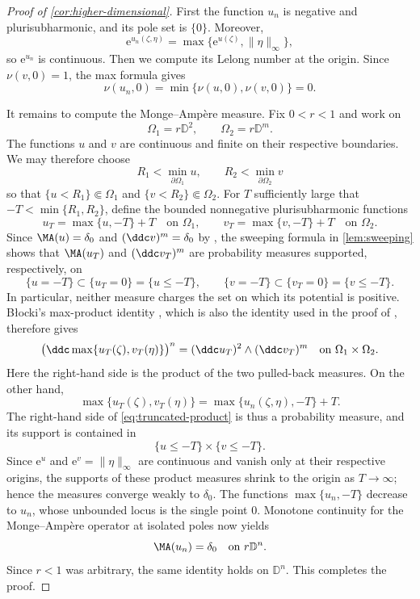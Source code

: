\documentclass[11pt,a4paper]{article}
\newcommand{\e}{\mathrm e}
\begin{document}
\begin{proof}[Proof of \cref{cor:higher-dimensional}]

First the function $u_n$ is negative and plurisubharmonic, and its pole set is $\{0\}$. Moreover,
\[
  \e^{u_n(\zeta,\eta)}=\max\{\e^{u(\zeta)},\|\eta\|_\infty\},
\]
so $\e^{u_n}$ is continuous.
Then we compute its Lelong number at the origin. Since $\nu(v,0)=1$, the max formula gives
\[
  \nu(u_n,0)=\min\{\nu(u,0),\nu(v,0)\}=0.
\]

It remains to compute the Monge--Amp\`ere measure. Fix $0<r<1$ and work on
\[
  \Omega_1=r\mathbb D^2,\qquad \Omega_2=r\mathbb D^m.
\]
The functions $u$ and $v$ are continuous and finite on their respective boundaries. We may therefore choose
\[
  R_1<\min_{\partial\Omega_1}u,\qquad R_2<\min_{\partial\Omega_2}v
\]
so that $\{u<R_1\}\Subset\Omega_1$ and $\{v<R_2\}\Subset\Omega_2$. For $T$ sufficiently large that $-T<\min\{R_1,R_2\}$, define the bounded nonnegative plurisubharmonic functions
\[
  u_T=\max\{u,-T\}+T \quad\text{on }\Omega_1,
  \qquad
  v_T=\max\{v,-T\}+T \quad\text{on }\Omega_2.
\]
Since $\MA(u)=\delta_0$ and $(\ddc v)^m=\delta_0$ by \cite[Chapter~III, Corollary~7.4]{DemaillyCADG}, the sweeping formula in \cref{lem:sweeping} shows that $\MA(u_T)$ and $(\ddc v_T)^m$ are probability measures supported, respectively, on
\[
  \{u=-T\}\subset\{u_T=0\}=\{u\le-T\},
  \qquad
  \{v=-T\}\subset\{v_T=0\}=\{v\le-T\}.
\]
In particular, neither measure charges the set on which its potential is positive. B{\l}ocki's max-product identity \cite[Theorem~7]{Blo00}, which is also the identity used in the proof of \cite[Theorem~5.7]{Wik05}, therefore gives
\begin{equation}\label{eq:truncated-product}
  \bigl(\ddc\max\{u_T(\zeta),v_T(\eta)\}\bigr)^n
  =(\ddc u_T)^2\wedge(\ddc v_T)^m
  \quad\text{on }\Omega_1\times\Omega_2.
\end{equation}
Here the right-hand side is the product of the two pulled-back measures. On the other hand,
\[
  \max\{u_T(\zeta),v_T(\eta)\}
  =\max\{u_n(\zeta,\eta),-T\}+T.
\]
The right-hand side of \eqref{eq:truncated-product} is thus a probability measure, and its support is contained in
\[
  \{u\le-T\}\times\{v\le-T\}.
\]
Since $\e^u$ and $\e^v=\|\eta\|_\infty$ are continuous and vanish only at their respective origins, the supports of these product measures shrink to the origin as $T\to\infty$; hence the measures converge weakly to $\delta_0$. The functions $\max\{u_n,-T\}$ decrease to $u_n$, whose unbounded locus is the single point $0$. Monotone continuity for the Monge--Amp\`ere operator at isolated poles \cite[Chapter~III, Corollary~4.3]{DemaillyCADG} now yields
\[
  \MA(u_n)=\delta_0
  \quad\text{on }r\mathbb D^n.
\]
Since $r<1$ was arbitrary, the same identity holds on $\mathbb D^n$. This completes the proof.
\end{proof}
\end{document}
